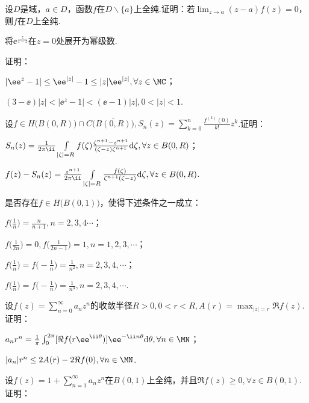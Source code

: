 \begin{xiti}
\item 设$D$是域，$a\in D$，函数$f$在$D\backslash\{a\}$上全纯.证明：若$\lim_{z\to a}(z-a)f(z)=0$，则$f$在$D$上全纯.
\item 将$\ee^{\frac z{1-z}}$在$z=0$处展开为幂级数.
\item 证明：
  \begin{enuma}
    \item $|\ee^z-1|\le\ee^{|z|}-1\le|z|\ee^{|z|},\forall z\in \MC$；
    \item $(3-\ee)|z|<|\ee^z-1|<(\ee-1)|z|,0<|z|<1$.
  \end{enuma}
\item 设$f\in H\big(B(0,R)\big)\cap C\big(\bar{B(0,R)}\big),S_n(z)=\sum_{k=0}^n
\frac{f^{(k)}(0)}{k!}z^k$.证明：
\begin{enuma}
  \item $S_n(z)=\frac1{2\pi\ii}\int\limits_{|\zeta|=R}f(\zeta)\frac{\zeta^{n+1}-z^{n+1}}
      {(\zeta-z)\zeta^{n+1}}\textrm d\zeta,\forall z\in B(0,R)$；
  \item $f(z)-S_n(z)=\frac{z^{n+1}}{2\pi\ii}\int\limits_{|\zeta|=R}
  \frac{f(\zeta)}{\zeta^{n+1}(\zeta-z)}\textrm d\zeta,\forall z\in B(0,R)$.
\end{enuma}
\item 是否存在$f\in H\big(B(0,1)\big)$，使得下述条件之一成立：
\begin{enuma}
  \item $f\bigg(\frac1n\bigg)=\frac n{n+1},n=2,3,4\cdots$；
  \item $f\bigg(\frac1{2n}\bigg)=0,f\bigg(\frac1{2n-1}\bigg)=1,n=1,2,3,\cdots$；
  \item $f\bigg(\frac1n\bigg)=f\bigg(-\frac1n\bigg)=\frac1{n^2},n=2,3,4,\cdots$；
  \item $f\bigg(\frac1n\bigg)=f\bigg(-\frac1n\bigg)=\frac1{n^3},n=2,3,4,\cdots$.
\end{enuma}
\item 设$f(z)=\sum_{n=0}^\infty a_nz^n$的收敛半径$R>0,0<r<R,A(r)=\max_{|z|=r}
\Re f(z)$. 证明：
\begin{enuma}
  \item $a_nr^n=\frac1\pi\int_0^{2\pi}[\Re f(r\ee^{\ii\theta})]\ee^{-\ii n\theta}\textrm d\theta,\forall n\in \MN$；
  \item $|a_n|r^n\le 2A(r)-2\Re f(0),\forall n\in \MN$.
\end{enuma}
\item 设$f(z)=1+\sum_{n=1}^\infty a_nz^n$在$B(0,1)$上全纯，并且$\Re f(z)\ge0,\forall z\in B(0,1)$.证明：

\end{xiti}
